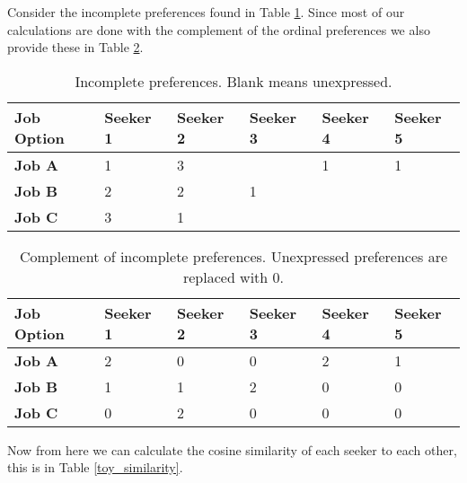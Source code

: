 Consider the incomplete preferences found in Table \ref{toy_incomplete}. Since most of our calculations are done with the complement of the ordinal preferences we also provide these in Table \ref{toy_complement}.

\begin{table}[h!]
\begin{center}
\caption{Incomplete preferences. Blank means unexpressed.}
\label{toy_incomplete}
\begin{tabular}{l|l|l|l|l|l}
\hline 
\textbf{Job Option} & \textbf{Seeker 1} &  \textbf{Seeker 2} & \textbf{Seeker 3} &\textbf{Seeker 4} &\textbf{Seeker 5} \\
\hline
\textbf{Job A} & 1 & 3 &  & 1 & 1\\
\textbf{Job B} & 2 & 2 & 1 & &\\
\textbf{Job C} & 3 & 1 &  & &\\
\hline 
\end{tabular}
\end{center}
\end{table}

\begin{table}[h!]
\begin{center}
\caption{Complement of incomplete preferences. Unexpressed preferences are replaced with 0.}
\label{toy_complement}
\begin{tabular}{l|l|l|l|l|l}
\hline 
\textbf{Job Option} & \textbf{Seeker 1} &  \textbf{Seeker 2} & \textbf{Seeker 3} &\textbf{Seeker 4} &\textbf{Seeker 5} \\
\hline
\textbf{Job A} & 2 & 0 & 0 & 2 & 1\\
\textbf{Job B} & 1 & 1 & 2 & 0 & 0\\
\textbf{Job C} & 0 & 2 & 0 & 0 & 0\\
\hline 
\end{tabular}
\end{center}
\end{table}

Now from here we can calculate the cosine similarity of each seeker to each other, this is in Table \ref{toy_similarity}.

